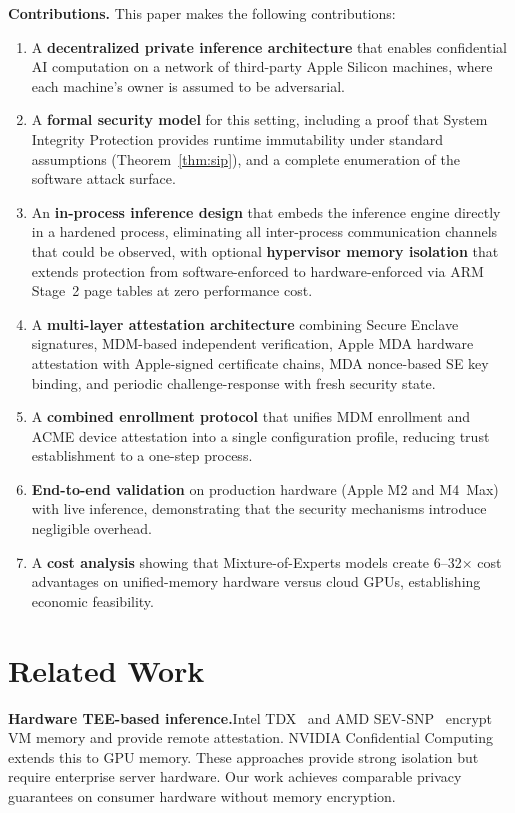 \documentclass[10pt,twocolumn,letterpaper]{article}
\begin{document}
\textbf{Contributions.} This paper makes the following contributions:
\begin{enumerate}[leftmargin=*,itemsep=2pt,topsep=2pt]
    \item A \textbf{decentralized private inference architecture} that enables confidential AI computation on a network of third-party Apple Silicon machines, where each machine's owner is assumed to be adversarial.
    \item A \textbf{formal security model} for this setting, including a proof that System Integrity Protection provides runtime immutability under standard assumptions (Theorem~\ref{thm:sip}), and a complete enumeration of the software attack surface.
    \item An \textbf{in-process inference design} that embeds the inference engine directly in a hardened process, eliminating all inter-process communication channels that could be observed, with optional \textbf{hypervisor memory isolation} that extends protection from software-enforced to hardware-enforced via ARM Stage~2 page tables at zero performance cost.
    \item A \textbf{multi-layer attestation architecture} combining Secure Enclave signatures, MDM-based independent verification, Apple MDA hardware attestation with Apple-signed certificate chains, MDA nonce-based SE key binding, and periodic challenge-response with fresh security state.
    \item A \textbf{combined enrollment protocol} that unifies MDM enrollment and ACME device attestation into a single configuration profile, reducing trust establishment to a one-step process.
    \item \textbf{End-to-end validation} on production hardware (Apple M2 and M4~Max) with live inference, demonstrating that the security mechanisms introduce negligible overhead.
    \item A \textbf{cost analysis} showing that Mixture-of-Experts models create 6--32$\times$ cost advantages on unified-memory hardware versus cloud GPUs, establishing economic feasibility.
\end{enumerate}

\section{Related Work}
\label{sec:related}

\textbf{Hardware TEE-based inference.}\quad Intel TDX~\cite{intel-tdx} and AMD SEV-SNP~\cite{amd-sev} encrypt VM memory and provide remote attestation. NVIDIA Confidential Computing~\cite{nvidia-cc} extends this to GPU memory. These approaches provide strong isolation but require enterprise server hardware. Our work achieves comparable privacy guarantees on consumer hardware without memory encryption.
\end{document}
